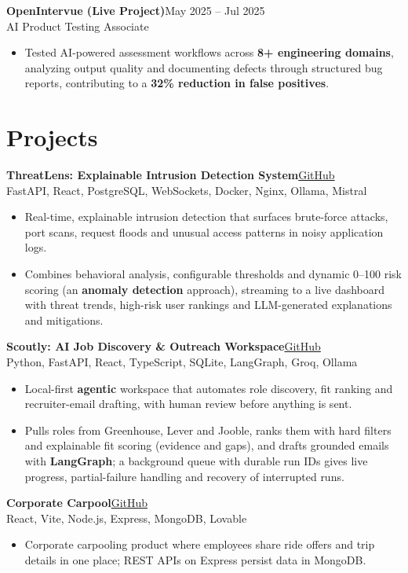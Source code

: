 \documentclass[letterpaper,10pt]{article}
\newcommand{\entry}[4]{%
  \vspace{2pt}\noindent\textbf{#1}\hfill #2\\
  #3\hfill #4\par\vspace{-1pt}}
\newcommand{\projentry}[4]{%
  \vspace{2pt}\noindent\textbf{#1}\hfill #2\\
  #4\par\vspace{-1pt}}
\begin{document}
\entry{OpenIntervue (Live Project)}{May 2025 -- Jul 2025}{AI Product Testing Associate}{}
\begin{itemize}
  \small
  \item Tested AI-powered assessment workflows across \textbf{8+ engineering domains}, analyzing output quality and documenting defects through structured bug reports, contributing to a \textbf{32\% reduction in false positives}.
\end{itemize}

\section{Projects}

\projentry{ThreatLens: Explainable Intrusion Detection System}{\href{https://github.com/harshitha7104/Threat-Lens}{GitHub}}{}{\small FastAPI, React, PostgreSQL, WebSockets, Docker, Nginx, Ollama, Mistral}
\begin{itemize}
  \small
  \item Real-time, explainable intrusion detection that surfaces brute-force attacks, port scans, request floods and unusual access patterns in noisy application logs.
  \item Combines behavioral analysis, configurable thresholds and dynamic 0--100 risk scoring (an \textbf{anomaly detection} approach), streaming to a live dashboard with threat trends, high-risk user rankings and LLM-generated explanations and mitigations.
\end{itemize}

\projentry{Scoutly: AI Job Discovery \& Outreach Workspace}{\href{https://github.com/harshitha7104/cold-email-agent}{GitHub}}{}{\small Python, FastAPI, React, TypeScript, SQLite, LangGraph, Groq, Ollama}
\begin{itemize}
  \small
  \item Local-first \textbf{agentic} workspace that automates role discovery, fit ranking and recruiter-email drafting, with human review before anything is sent.
  \item Pulls roles from Greenhouse, Lever and Jooble, ranks them with hard filters and explainable fit scoring (evidence and gaps), and drafts grounded emails with \textbf{LangGraph}; a background queue with durable run IDs gives live progress, partial-failure handling and recovery of interrupted runs.
\end{itemize}

\projentry{Corporate Carpool}{\href{https://github.com/harshitha7104/corporate-carpool}{GitHub}}{}{\small React, Vite, Node.js, Express, MongoDB, Lovable}
\begin{itemize}
  \small
  \item Corporate carpooling product where employees share ride offers and trip details in one place; REST APIs on Express persist data in MongoDB.
\end{itemize}
\end{document}
